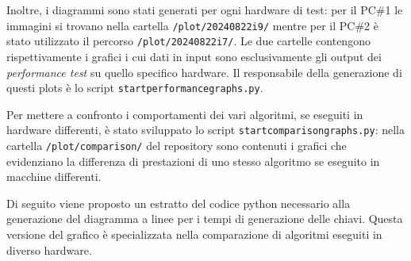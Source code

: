 Inoltre, i diagrammi sono stati generati per ogni hardware di test: per il PC\#1 le immagini si trovano nella cartella \texttt{/plot/20240822\textunderscore i9/} mentre per il PC\#2 è stato utilizzato il percorso \texttt{/plot/20240822\textunderscore i7/}. Le due cartelle contengono rispettivamente i grafici i cui dati in input sono esclusivamente gli output dei \textit{performance test} su quello specifico hardware. Il responsabile della generazione di questi plots è lo script \texttt{start\textunderscore performancegraphs.py}.

Per mettere a confronto i comportamenti dei vari algoritmi, se eseguiti in hardware differenti, è stato sviluppato lo script \texttt{start\textunderscore comparisongraphs.py}: nella cartella \texttt{/plot/comparison/} del repository sono contenuti i grafici che evidenziano la differenza di prestazioni di uno stesso algoritmo se eseguito in macchine differenti.

Di seguito viene proposto un estratto del codice python necessario alla generazione del diagramma a linee per i tempi di generazione delle chiavi. Questa versione del grafico è specializzata nella comparazione di algoritmi eseguiti in diverso hardware.

